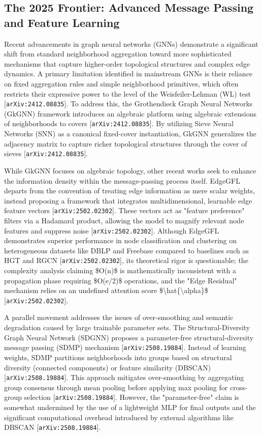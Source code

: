 \documentclass[11pt]{article}
\begin{document}
\subsection{The 2025 Frontier: Advanced Message Passing and Feature Learning}

Recent advancements in graph neural networks (GNNs) demonstrate a significant shift from standard neighborhood aggregation toward more sophisticated mechanisms that capture higher-order topological structures and complex edge dynamics. A primary limitation identified in mainstream GNNs is their reliance on fixed aggregation rules and simple neighborhood primitives, which often restricts their expressive power to the level of the Weisfeiler-Lehman (WL) test [\texttt{arXiv:2412.08835}]. To address this, the Grothendieck Graph Neural Networks (GkGNN) framework introduces an algebraic platform using algebraic extensions of neighborhoods to covers [\texttt{arXiv:2412.08835}]. By utilizing Sieve Neural Networks (SNN) as a canonical fixed-cover instantiation, GkGNN generalizes the adjacency matrix to capture richer topological structures through the cover of sieves [\texttt{arXiv:2412.08835}].

While GkGNN focuses on algebraic topology, other recent works seek to enhance the information density within the message-passing process itself. EdgeGFL departs from the convention of treating edge information as mere scalar weights, instead proposing a framework that integrates multidimensional, learnable edge feature vectors [\texttt{arXiv:2502.02302}]. These vectors act as "feature preference" filters via a Hadamard product, allowing the model to magnify relevant node features and suppress noise [\texttt{arXiv:2502.02302}]. Although EdgeGFL demonstrates superior performance in node classification and clustering on heterogeneous datasets like DBLP and Freebase compared to baselines such as HGT and RGCN [\texttt{arXiv:2502.02302}], its theoretical rigor is questionable; the complexity analysis claiming \$O(n)\$ is mathematically inconsistent with a propagation phase requiring \$O(e/2)\$ operations, and the "Edge Residual" mechanism relies on an undefined attention score \$\textbackslash{}hat\{\textbackslash{}alpha\}\$ [\texttt{arXiv:2502.02302}].

A parallel movement addresses the issues of over-smoothing and semantic degradation caused by large trainable parameter sets. The Structural-Diversity Graph Neural Network (SDGNN) proposes a parameter-free structural-diversity message passing (SDMP) mechanism [\texttt{arXiv:2508.19884}]. Instead of learning weights, SDMP partitions neighborhoods into groups based on structural diversity (connected components) or feature similarity (DBSCAN) [\texttt{arXiv:2508.19884}]. This approach mitigates over-smoothing by aggregating group consensus through mean pooling before applying max pooling for cross-group selection [\texttt{arXiv:2508.19884}]. However, the "parameter-free" claim is somewhat undermined by the use of a lightweight MLP for final outputs and the significant computational overhead introduced by external algorithms like DBSCAN [\texttt{arXiv:2508.19884}].
\end{document}
